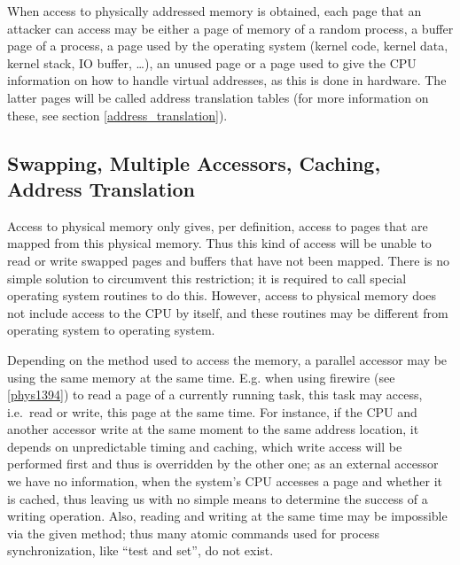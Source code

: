 When access to physically addressed memory is obtained, each page that an
attacker can access may be either a page of memory of a random process, a buffer
page of a process, a page used by the operating system (kernel code, kernel
data, kernel stack, IO buffer, \dots), an unused page or a page used to give the
CPU information on how to handle virtual addresses, as this is done in hardware.
The latter pages will be called address translation tables (for more information
on these, see section \ref{address_translation}).

\subsection{Swapping, Multiple Accessors, Caching, Address Translation}


Access to physical memory only gives, per definition, access to pages that are
mapped from this physical memory. Thus this kind of access will be unable to
read or write swapped pages and buffers that have not been mapped. There is no
simple solution to circumvent this restriction; it is required to call special
operating system routines to do this. However, access to physical memory does
not include access to the CPU by itself, and these routines may be different
from operating system to operating system.

Depending on the method used to access the memory, a parallel accessor may be
using the same memory at the same time. E.g\@. when using firewire (see
\ref{phys1394}) to read a page of a currently running task, this task may
access, i.e.~read or write, this page at the same time. For instance, if the CPU
and another accessor write at the same moment to the same address location, it
depends on unpredictable timing and caching, which write access will be
performed first and thus is overridden by the other one; as an external accessor
we have no information, when the system's CPU accesses a page and whether it is
cached, thus leaving us with no simple means to determine the success of a
writing operation.  Also, reading and writing at the same time may be impossible
via the given method; thus many atomic commands used for process
synchronization, like ``test and set'', do not exist.  

